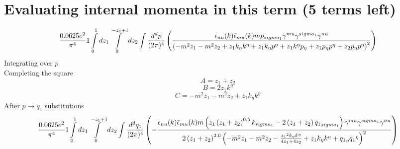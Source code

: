 \section*{Evaluating internal momenta in this term (5 terms left)}
\begin{dmath}\frac{0.0625 e^{2}}{\pi^{4}}1\int\limits_{ 0 }^{ 1 } d{ z_{ 1 } }\int\limits_{ 0 }^{ - { z_{ 1 } } + 1 } d{ z_{ 2 } }\int\frac{d^d p }{ (2\pi)^4 }\left(\frac{\epsilon_{ \\nu }({ k }) \bar{\epsilon}_{ \\mu }({ k }) m { { p }_{ \\sigma_1 } } { \gamma^{ \\mu } } { \gamma^{ \\sigma_1 } } { \gamma^{ \\nu } }}{\left(- m^{2} { z_{ 1 } } - m^{2} { z_{ 2 } } + { z_{ 1 } } { { k }_{ \eta } } { { k }^{ \eta } } + { z_{ 1 } } { { k }_{ \eta } } { { p }^{ \eta } } + { z_{ 1 } } { { k }^{ \eta } } { { p }_{ \eta } } + { z_{ 1 } } { { p }_{ \eta } } { { p }^{ \eta } } + { z_{ 2 } } { { p }_{ \eta } } { { p }^{ \eta } }\right)^{2}}\right)\end{dmath}
Integrating over $p$\\
Completing the square\
\begin{dmath}A = { z_{ 1 } } + { z_{ 2 } }\end{dmath}
\begin{dmath}B = 2 { z_{ 1 } } { { k }^{ \eta } }\end{dmath}
\begin{dmath}C = - m^{2} { z_{ 1 } } - m^{2} { z_{ 2 } } + { z_{ 1 } } { { k }_{ \eta } } { { k }^{ \eta } }\end{dmath}
After $p \to q_1$ substitutions
\begin{dmath}\frac{0.0625 e^{2}}{\pi^{4}}1\int\limits_{ 0 }^{ 1 } d{ z_{ 1 } }\int\limits_{ 0 }^{ - { z_{ 1 } } + 1 } d{ z_{ 2 } }\int\frac{d^d q_1 }{ (2\pi)^4 }\left(- \frac{\epsilon_{ \\nu }({ k }) \bar{\epsilon}_{ \\mu }({ k }) m \left({ z_{ 1 } } \left({ z_{ 1 } } + { z_{ 2 } }\right)^{0.5} { { k }_{ \\sigma_1 } } - 2 \left({ z_{ 1 } } + { z_{ 2 } }\right) { { q_1 }_{ \\sigma_1 } }\right) { \gamma^{ \\mu } } { \gamma^{ \\sigma_1 } } { \gamma^{ \\nu } }}{2 \left({ z_{ 1 } } + { z_{ 2 } }\right)^{2.0} \left(- m^{2} { z_{ 1 } } - m^{2} { z_{ 2 } } - \frac{{ z_{ 1 } }^{2} { { k }_{ \eta } } { { k }^{ \eta } }}{4 { z_{ 1 } } + 4 { z_{ 2 } }} + { z_{ 1 } } { { k }_{ \eta } } { { k }^{ \eta } } + { { q_1 }_{ \eta } } { { q_1 }^{ \eta } }\right)^{2}}\right)\end{dmath}
